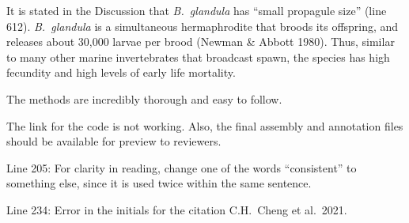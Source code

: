 
\begin{point}{} %
It is stated in the Discussion that \emph{B.\ glandula} has ``small
propagule size'' (line 612). \emph{B.\ glandula} is a simultaneous
hermaphrodite that broods its offspring, and releases about 30,000 larvae
per brood (Newman \& Abbott 1980). Thus, similar to many other marine
invertebrates that broadcast spawn, the species has high fecundity and
high levels of early life mortality.
\end{point}


\begin{point}{} %
The methods are incredibly thorough and easy to follow.
\end{point}


\begin{point}{} %
The link for the code is not working. Also, the final assembly and
annotation files should be available for preview to reviewers.
\end{point}


\begin{point}{} %
Line 205: For clarity in reading, change one of the words ``consistent''
to something else, since it is used twice within the same sentence.
\end{point}


\begin{point}{} %
Line 234: Error in the initials for the citation C.H.\ Cheng et al.\
2021.
\end{point}


\pagebreak

\reviewersection{2}


